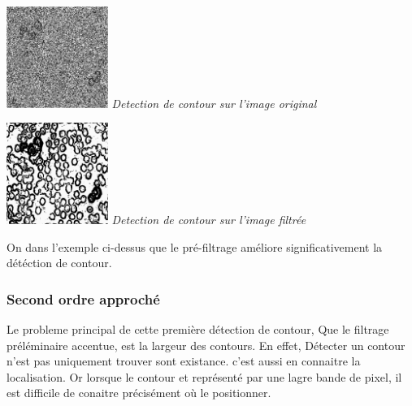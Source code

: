 \documentclass[a4,12pt]{article}
\begin{document}
\noindent
\begin{center}
\begin{minipage}[c]{0.20\linewidth}
	\begin{center}
		\includegraphics[width = 33mm]{./img/globulesbb26_mean.jpg}
		\textit{Detection de contour sur l'image original}
	\end{center}
\end{minipage}
\begin{minipage}[c]{0.20\linewidth}
	\begin{center}
		\includegraphics[width = 33mm]{./img/globulesbb26_filtrer3_mean.jpg}
		\textit{Detection de contour sur l'image filtrée}
	\end{center}
\end{minipage}
\end{center}

On dans l'exemple ci-dessus que le pré-filtrage améliore significativement la détéction de contour.\\

\subsubsection{Second ordre approché}
Le probleme principal de cette première détection de contour, Que le filtrage préléminaire accentue, est la largeur des contours.
En effet, Détecter un contour n'est pas uniquement trouver sont existance. c'est aussi en connaitre la localisation. Or lorsque le contour et représenté par une
lagre bande de pixel, il est difficile de conaitre précisément où le positionner.\\
\end{document}
